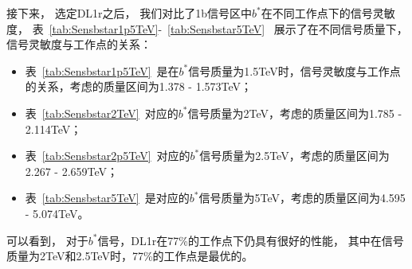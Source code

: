 接下来，
选定DL1r之后，
我们对比了1b信号区中$b^*$在不同工作点下的信号灵敏度，
表~\ref{tab:Sensbstar1p5TeV}-~\ref{tab:Sensbstar5TeV}~
展示了在不同信号质量下，信号灵敏度与工作点的关系：
\begin{itemize}
        \item 表~\ref{tab:Sensbstar1p5TeV}~是在$b^*$信号质量为1.5TeV时，信号灵敏度与工作点的关系，考虑的质量区间为1.378 - 1.573TeV；
	\item 表~\ref{tab:Sensbstar2TeV}~对应的$b^*$信号质量为2TeV，考虑的质量区间为1.785 - 2.114TeV；
	\item 表~\ref{tab:Sensbstar2p5TeV}~对应的$b^*$信号质量为2.5TeV，考虑的质量区间为2.267 - 2.659TeV；
	\item 表~\ref{tab:Sensbstar5TeV}~是对应的$b^*$信号质量为5TeV，考虑的质量区间为4.595 - 5.074TeV。
\end{itemize}
可以看到，
对于$b^*$信号，DL1r在77\%的工作点下仍具有很好的性能，
其中在信号质量为2TeV和2.5TeV时，77\%的工作点是最优的。



